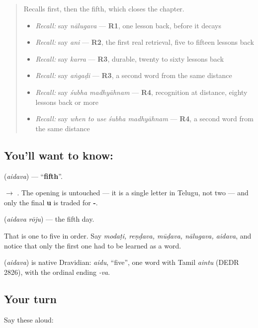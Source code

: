 \begin{quote}
Recalls first, then the fifth, which closes the chapter.

\begin{itemize}
\raggedright
  \item \emph{Recall:} say \emph{nālugava} — \textbf{R1}, one lesson back, before it decays
  \item \emph{Recall:} say \emph{ani} — \textbf{R2}, the first real retrieval, five to fifteen lessons back
  \item \emph{Recall:} say \emph{karra} — \textbf{R3}, durable, twenty to sixty lessons back
  \item \emph{Recall:} say \emph{aṅgaḍi} — \textbf{R3}, a second word from the same distance
  \item \emph{Recall:} say \emph{śubha madhyāhnam} — \textbf{R4}, recognition at distance, eighty lessons back or more
  \item \emph{Recall:} say \emph{when to use śubha madhyāhnam} — \textbf{R4}, a second word from the same distance
\end{itemize}
\end{quote}

\subsection*{You'll want to know: }
\textbf{} (\emph{aidava}) — \textquotedblleft{}\textbf{fifth}\textquotedblright{}.

\textbf{} $\to$ \textbf{}. The opening \textbf{} is untouched — it is a single letter in Telugu, not two — and only the final \textbf{u} is traded for \textbf{-}.

\textbf{ } (\emph{aidava rōju}) — the fifth day.

That is one to five in order. Say \emph{modaṭi, reṇḍava, mūḍava, nālugava, aidava}, and notice that only the first one had to be learned as a word.

\begin{cousinweb}
\textbf{} (\emph{aidava}) is native Dravidian: \emph{aidu}, \textquotedblleft{}five\textquotedblright{}, one word with Tamil \emph{aintu} (DEDR 2826), with the ordinal ending \emph{-va}.
\end{cousinweb}

\subsection*{Your turn}
Say these aloud:

